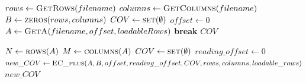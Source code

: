 \documentclass{beamer}
\begin{document}
\begin{frame}{}
    \begin{algorithmic}[1]
            \State $rows \gets \Call{GetRows}{filename}$
            \State $columns \gets \Call{GetColumns}{filename}$
            \State $B \gets \Call{zeros}{rows, columns}$
            \State $COV \gets \Call{set}{\emptyset}$
            \State $offset \gets 0$
                \State $A \gets \Call{GetA}{filename, offset, loadableRows}$
                    \State \textbf{break}
                \EndIf
                \State {}
            \EndWhile
            \State \Return $COV$
        \EndFunction
    \end{algorithmic}
\end{frame}


\begin{frame}{}
    \begin{algorithmic}[1]
            \State $N \gets \Call{rows}{A}$ 
            \State $M \gets \Call{columns}{A}$ 
            \State $COV \gets \Call{set}{\emptyset}$
            \State $reading\_offset \gets 0$
            \State $new\_COV \gets \Call{EC\_plus}{A, B, offset, reading\_offset, COV, rows, columns, loadable\_rows}$
            \State \Return $new\_COV$
        \EndFunction
    \end{algorithmic}
\end{frame}
\end{document}
